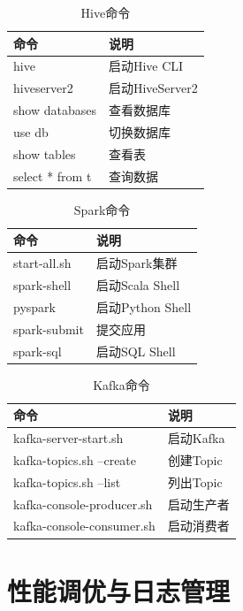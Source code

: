 \documentclass[12pt,a4paper]{article}
\begin{document}
\begin{table}[H]
\centering
\caption{Hive命令}
\begin{tabular}{ll}
\toprule
\textbf{命令} & \textbf{说明} \\
\midrule
hive & 启动Hive CLI \\
hiveserver2 & 启动HiveServer2 \\
show databases & 查看数据库 \\
use db & 切换数据库 \\
show tables & 查看表 \\
select * from t & 查询数据 \\
\bottomrule
\end{tabular}
\end{table}

\begin{table}[H]
\centering
\caption{Spark命令}
\begin{tabular}{ll}
\toprule
\textbf{命令} & \textbf{说明} \\
\midrule
start-all.sh & 启动Spark集群 \\
spark-shell & 启动Scala Shell \\
pyspark & 启动Python Shell \\
spark-submit & 提交应用 \\
spark-sql & 启动SQL Shell \\
\bottomrule
\end{tabular}
\end{table}

\begin{table}[H]
\centering
\caption{Kafka命令}
\begin{tabular}{ll}
\toprule
\textbf{命令} & \textbf{说明} \\
\midrule
kafka-server-start.sh & 启动Kafka \\
kafka-topics.sh --create & 创建Topic \\
kafka-topics.sh --list & 列出Topic \\
kafka-console-producer.sh & 启动生产者 \\
kafka-console-consumer.sh & 启动消费者 \\
\bottomrule
\end{tabular}
\end{table}

\section{性能调优与日志管理}
\end{document}
